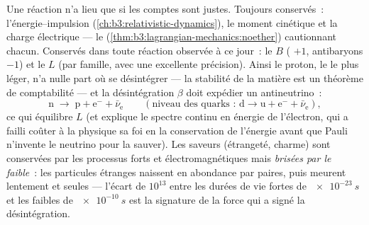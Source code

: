 \begin{proposition}\label{prop:b3:particle-physics:conservation}
Une réaction n'a lieu que si les comptes sont justes. Toujours
conservés~: l'énergie--impulsion
(\cref{ch:b3:relativistic-dynamics}), le moment cinétique et la
charge électrique --- le 
(\cref{thm:b3:lagrangian-mechanics:noether}) cautionnant chacun.
Conservés dans toute réaction observée à ce jour~: le \emph{} $B$ ( $+1$, antibaryons $-1$) et le \emph{} $L$ (par famille, avec une excellente précision). Ainsi
le proton, le  le plus léger, n'a nulle part où se désintégrer
--- la stabilité de la matière est un théorème de comptabilité ---
et la désintégration $\beta$ doit expédier un antineutrino~:
\[
\text{n} \;\to\; \text{p} + \text{e}^- + \bar\nu_{\text{e}}
\qquad (\text{niveau des quarks~: } \text{d} \to \text{u} +
\text{e}^- + \bar\nu_{\text{e}}) ,
\]
ce qui équilibre $L$ (et explique le spectre continu en énergie de
l'électron, qui a failli coûter à la physique sa foi en la
conservation de l'énergie avant que Pauli n'invente le neutrino pour
la sauver). Les saveurs (étrangeté, charme) sont conservées par les
processus forts et électromagnétiques mais \emph{brisées par le
faible}~: les particules étranges naissent en abondance par paires,
puis meurent lentement et seules --- l'écart de $10^{13}$ entre les
durées de vie fortes de $\qty{e-23}{s}$ et les faibles de
$\qty{e-10}{s}$ est la signature de la force qui a signé la
désintégration.
\end{proposition}
\admitted

